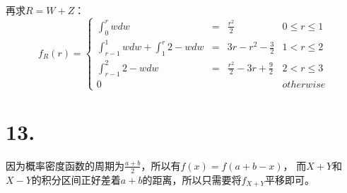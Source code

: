 \documentclass[UTF8]{report}
\begin{document}
        再求$R = W + Z$：
        $$f_R(r) = \left\{
            \begin{array}{llccr}
                \int_{0}^{r}wdw & = & \frac{r^2}{2} & 0 \leq r \leq 1\\
                \int_{r - 1}^{1}wdw + \int_{1}^{r}2-wdw & = & 3r - r^2 - \frac{3}{2} & 1 < r \leq 2\\
                \int_{r - 1}^{2}2 - wdw & = & \frac{r^2}{2} - 3r + \frac{9}{2} & 2 < r \leq 3\\
                0 & & & otherwise
            \end{array}
        \right.$$
    \section*{13.}
        因为概率密度函数的周期为$\frac{a + b}{2}$，所以有$f(x) = f(a + b - x)$，
        而$X + Y$和$X - Y$的积分区间正好差着$a + b$的距离，所以只需要将$f_{X + Y}$平移即可。
\end{document}
